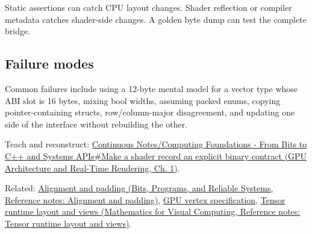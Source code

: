 Static assertions can catch CPU layout changes. Shader reflection or compiler metadata catches shader-side changes. A golden byte dump can test the complete bridge.

\subsection{Failure modes}\label{appendix-749048795dbb-failure-modes}

Common failures include using a 12-byte mental model for a vector type whose ABI slot is 16 bytes, mixing bool widths, assuming packed enums, copying pointer-containing structs, row/column-major disagreement, and updating one side of the interface without rebuilding the other.

Teach and reconstruct: \href{../06-GPU-Architecture-and-Real-Time-Rendering/main.pdf\#nameddest=01-foundations-i-ch008-make-a-shader-record-an-explicit-binary-contract}{Continuous Notes/Computing Foundations - From Bits to C++ and Systems APIs\#Make a shader record an explicit binary contract (GPU Architecture and Real-Time Rendering, Ch. 1)}.

Related: \href{../01-Bits-Programs-and-Reliable-Systems/main.pdf\#nameddest=appendix-a1f7c53b4742}{Alignment and padding (Bits, Programs, and Reliable Systems, Reference notes: Alignment and padding)}, \hyperref[appendix-749ba51a6c25]{GPU vertex specification}, \href{../02-Mathematics-for-Visual-Computing/main.pdf\#nameddest=appendix-cebadf3106d1}{Tensor runtime layout and views (Mathematics for Visual Computing, Reference notes: Tensor runtime layout and views)}.
